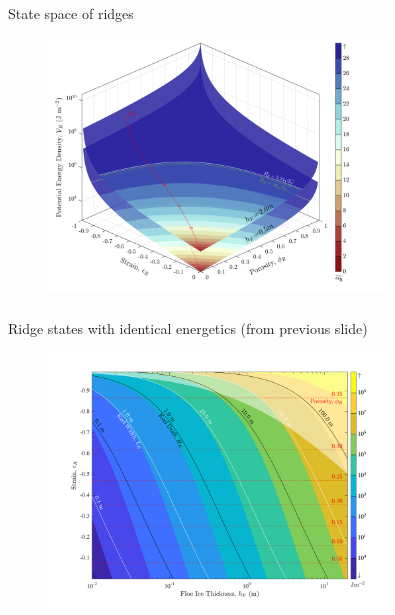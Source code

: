 \documentclass[aspectratio=169,11pt]{beamer}
\begin{document}
\begin{frame}
\frametitle{\insertsection}
\centering
State space of ridges
\begin{figure}[ht]
\noindent\centerline{\includegraphics[width=0.8\textwidth,height=\textheight,keepaspectratio]{Figures/revised_manifold.png}}
\end{figure}
\end{frame}

\begin{frame}
\frametitle{\insertsection}
\centering
Ridge states with identical energetics (from previous slide)
\begin{figure}[ht]
\noindent\centerline{\includegraphics[width=0.8\textwidth,height=\textheight,keepaspectratio]{Figures/Expected_Plane.png}}
\end{figure}
\end{frame}
\end{document}
